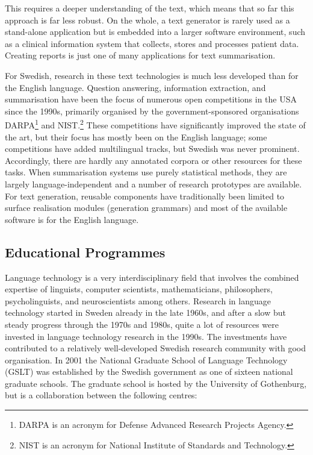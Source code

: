 \begin{multicols}{2}

This requires a deeper understanding of the text, which means that so far this approach is far less robust. On the whole, a text generator is rarely used as a stand-alone application but is embedded into a larger software environment, such as a clinical information system that collects, stores and processes patient data. Creating reports is just one of many applications for text summarisation. 

For Swedish, research in these text technologies is much less developed than for the English language. Question answering, information extraction, and summarisation have been the focus of numerous open competitions in the USA since the 1990s, primarily organised by the government-sponsored organisations DARPA\footnote{DARPA is an acronym for Defense Advanced Research Projects Agency.} and NIST.\footnote{NIST is an acronym for National Institute of Standards and Technology.} These competitions have significantly improved the state of the art, but their focus has mostly been on the English language; some competitions have added multilingual tracks, but Swedish was never prominent. Accordingly, there are hardly any annotated corpora or other resources for these tasks. When summarisation systems use purely statistical methods, they are largely language-independent and a number of research prototypes are available. For text generation, reusable components have traditionally been limited to surface realisation modules (generation grammars) and most of the available software is for the English language.

\subsection{Educational Programmes}

Language technology is a very interdisciplinary field that involves
the combined expertise of linguists, computer scientists,
mathematicians, philosophers, psycholinguists, and neuroscientists
among others. Research in language technology started in Sweden
already in the late 1960s, and after a slow but steady progress
through the 1970s and 1980s, quite a lot of resources were invested in
language technology research in the 1990s. The investments have
contributed to a relatively well-developed Swedish research community
with good organisation. In 2001 the National Graduate School of
Language Technology (GSLT) was established by the Swedish government
as one of sixteen national graduate schools. The graduate school is
hosted by the University of Gothenburg, but is a collaboration between
the following centres:


\end{multicols}
